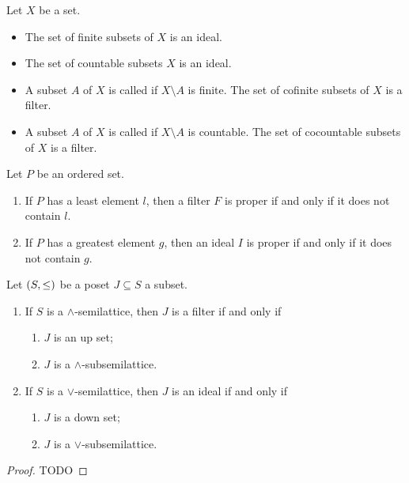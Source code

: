 \begin{example}
Let $X$ be a set.
\begin{itemize}
\item The set of finite subsets of $X$ is an ideal.
\item The set of countable subsets $X$ is an ideal.
\item A subset $A$ of $X$ is called  if $X\setminus A$ is finite. The set of cofinite subsets of $X$ is a filter.
\item A subset $A$ of $X$ is called  if $X\setminus A$ is countable. The set of cocountable subsets of $X$ is a filter.
\end{itemize}
\end{example}

\begin{lemma}
Let $P$ be an ordered set.
\begin{enumerate}
\item If $P$ has a least element $l$, then a filter $F$ is proper \textup{if and only if} it does not contain $l$.
\item If $P$ has a greatest element $g$, then an ideal $I$ is proper \textup{if and only if} it does not contain $g$.
\end{enumerate}
\end{lemma}


\begin{lemma}
Let $\left( S,\leq \right)$ be a poset $J\subseteq S$ a subset.
\begin{enumerate}
\item If $S$ is a $\wedge$-semilattice, then $J$ is a filter \textup{if and only if}
\begin{enumerate}
\item $J$ is an up set;
\item $J$ is a $\wedge$-subsemilattice.
\end{enumerate}
\item If $S$ is a $\vee$-semilattice, then $J$ is an ideal \textup{if and only if}
\begin{enumerate}
\item $J$ is a down set;
\item $J$ is a $\vee$-subsemilattice.
\end{enumerate}
\end{enumerate}
\end{lemma}
\begin{proof}
TODO
\end{proof}

